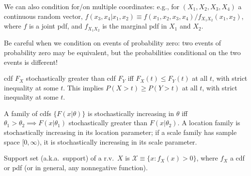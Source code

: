\documentclass[8pt,letterpaper, landscape]{extarticle} %
\newcommand{\X}{\ensuremath{\mathcal{X}}}
\begin{document}
\begin{multicols}{3}
\begin{description}
We can also condition for/on multiple coordinates: e.g., for $ (X_1, X_2, X_3, X_4) $ a continuous random vector, $ f(x_3, x_4|x_1, x_2) \equiv f(x_1, x_2, x_3, x_4) / f_{X_1 X_2}(x_1, x_2) $, where $ f $ is a joint pdf, and $ f_{X_1 X_2} $ is the marginal pdf in $ X_1 $ and $ X_2 $.

 Be careful when we condition on events of probability zero: two events of probability zero may be equivalent, but the probabilities conditional on the two events is different!

 cdf $ F_X $ stochastically greater than cdf $ F_Y $ iff $ F_X(t) \leq F_Y(t) $ at all $ t $, with strict inequality at some $ t $. This implies $ P (X > t) \geq P (Y > t) $ at all $ t $, with strict inequality at some $ t $.

A family of cdfs $ \{ F(x|\theta) \} $ is stochastically increasing in $ \theta $ iff $ \theta_1 > \theta_2 \implies F(x | \theta_1) $ stochastically greater than $ F(x | \theta_2) $. A location family is stochastically increasing in its location parameter; if a scale family has sample space $ [0, \infty) $, it is stochastically increasing in its scale parameter. 

 Support set (a.k.a.\ support) of a r.v.\ $ X $ is $ \X \equiv \{ x \colon f_X(x) > 0 \} $, where $ f_X $ a cdf or pdf (or in general, any nonnegative function).


\end{description}
\end{multicols}
\end{document}
